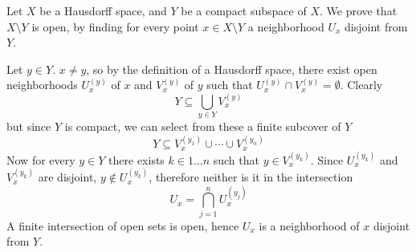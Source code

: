 \documentclass[12pt]{article}
\begin{document}
Let $X$ be a Hausdorff space, and $Y$ be a compact subspace of $X$. We prove that $X\setminus Y$ is open, by finding for every point $x \in X \setminus Y$ a neighborhood $U_x$ disjoint from $Y$.

Let $y \in Y$. $x \neq y$, so by the definition of a Hausdorff space, there exist open neighborhoods $U_x^{(y)}$ of $x$ and $V_x^{(y)}$ of $y$ such that $U_x^{(y)} \cap V_x^{(y)} = \emptyset$. Clearly
$$Y \subseteq \bigcup_{y \in Y} V_x^{(y)}$$
but since $Y$ is compact, we can select from these a finite subcover of $Y$
$$Y \subseteq V_x^{(y_1)} \cup \cdots \cup V_x^{(y_n)}$$
Now for every $y \in Y$ there exists $k \in 1...n$ such that $y \in V_x^{(y_k)}$. Since $U_x^{(y_k)}$ and $V_x^{(y_k)}$ are disjoint, $y \not\in U_x^{(y_k)}$, therefore neither is it in the intersection
$$U_x = \bigcap_{j=1}^n U_x^{(y_j)}$$
A finite intersection of open sets is open, hence $U_x$ is a neighborhood of $x$ disjoint from $Y$.
\end{document}
